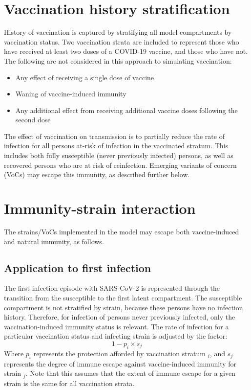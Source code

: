 \section{Vaccination history stratification}
History of vaccination is captured by stratifying all model compartments by vaccination status.
Two vaccination strata are included to represent those who have received at least two doses of a COVID-19 vaccine,
and those who have not.
The following are not considered in this approach to simulating vaccination:
\begin{itemize}
    \item Any effect of receiving a single dose of vaccine
    \item Waning of vaccine-induced immunity
    \item Any additional effect from receiving additional vaccine doses following the second dose
\end{itemize}
The effect of vaccination on transmission is to partially reduce the rate of infection for all persons at-risk of infection in the vaccinated stratum.
This includes both fully susceptible (never previously infected) persons,
as well as recovered persons who are at risk of reinfection.
Emerging variants of concern (VoCs) may escape this immunity, as described further below.

\section{Immunity-strain interaction}
The strains/VoCs implemented in the model may escape both vaccine-induced and natural immunity, as follows.

\subsection{Application to first infection}
The first infection episode with SARS-CoV-2 is represented through the transition from the susceptible
to the first latent compartment.
The susceptible compartment is not stratified by strain,
because these persons have no infection history.
Therefore, for infection of persons never previously infected,
only the vaccination-induced immunity status is relevant.
The rate of infection for a particular vaccination status and infecting strain is adjusted by the factor:
\[1 - p_{i} \times s_{j}\]
Where \(p_{i}\) represents the protection afforded by vaccination stratum \(_{i}\),
and \(s_{j}\) represents the degree of immune escape against vaccine-induced immunity for strain \(_{j}\).
Note that this assumes that the extent of immune escape for a given strain is the same
for all vaccination strata. 

